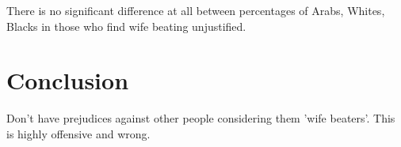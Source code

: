 \documentclass{amsart}
\begin{document}
There is no significant difference at all between percentages of Arabs, Whites, Blacks in those who find wife beating unjustified.

\section{Conclusion}

Don't have prejudices against other people considering them 'wife beaters'.  This is highly offensive and wrong.
\end{document}
